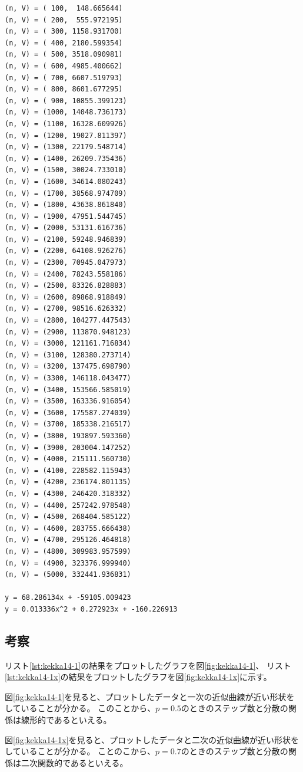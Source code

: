 \documentclass[a4j,titlepage]{jsarticle}
\begin{document}
\begin{lstlisting}[style=text,caption=pが0.7のときの実行結果,label=lst:kekka14-1x]
(n, V) = ( 100,  148.665644)
(n, V) = ( 200,  555.972195)
(n, V) = ( 300, 1158.931700)
(n, V) = ( 400, 2180.599354)
(n, V) = ( 500, 3518.090981)
(n, V) = ( 600, 4985.400662)
(n, V) = ( 700, 6607.519793)
(n, V) = ( 800, 8601.677295)
(n, V) = ( 900, 10855.399123)
(n, V) = (1000, 14048.736173)
(n, V) = (1100, 16328.609926)
(n, V) = (1200, 19027.811397)
(n, V) = (1300, 22179.548714)
(n, V) = (1400, 26209.735436)
(n, V) = (1500, 30024.733010)
(n, V) = (1600, 34614.080243)
(n, V) = (1700, 38568.974709)
(n, V) = (1800, 43638.861840)
(n, V) = (1900, 47951.544745)
(n, V) = (2000, 53131.616736)
(n, V) = (2100, 59248.946839)
(n, V) = (2200, 64108.926276)
(n, V) = (2300, 70945.047973)
(n, V) = (2400, 78243.558186)
(n, V) = (2500, 83326.828883)
(n, V) = (2600, 89868.918849)
(n, V) = (2700, 98516.626332)
(n, V) = (2800, 104277.447543)
(n, V) = (2900, 113870.948123)
(n, V) = (3000, 121161.716834)
(n, V) = (3100, 128380.273714)
(n, V) = (3200, 137475.698790)
(n, V) = (3300, 146118.043477)
(n, V) = (3400, 153566.585019)
(n, V) = (3500, 163336.916054)
(n, V) = (3600, 175587.274039)
(n, V) = (3700, 185338.216517)
(n, V) = (3800, 193897.593360)
(n, V) = (3900, 203004.147252)
(n, V) = (4000, 215111.560730)
(n, V) = (4100, 228582.115943)
(n, V) = (4200, 236174.801135)
(n, V) = (4300, 246420.318332)
(n, V) = (4400, 257242.978548)
(n, V) = (4500, 268404.585122)
(n, V) = (4600, 283755.666438)
(n, V) = (4700, 295126.464818)
(n, V) = (4800, 309983.957599)
(n, V) = (4900, 323376.999940)
(n, V) = (5000, 332441.936831)

y = 68.286134x + -59105.009423
y = 0.013336x^2 + 0.272923x + -160.226913
\end{lstlisting}

\subsection{考察}
リスト\ref{lst:kekka14-1}の結果をプロットしたグラフを図\ref{fig:kekka14-1}、
リスト\ref{lst:kekka14-1x}の結果をプロットしたグラフを図\ref{fig:kekka14-1x}に示す。

図\ref{fig:kekka14-1}を見ると、プロットしたデータと一次の近似曲線が近い形状をしていることが分かる。
このことから、$p = 0.5$のときのステップ数と分散の関係は線形的であるといえる。

図\ref{fig:kekka14-1x}を見ると、プロットしたデータと二次の近似曲線が近い形状をしていることが分かる。
ことのこから、$p = 0.7$のときのステップ数と分散の関係は二次関数的であるといえる。
\end{document}
